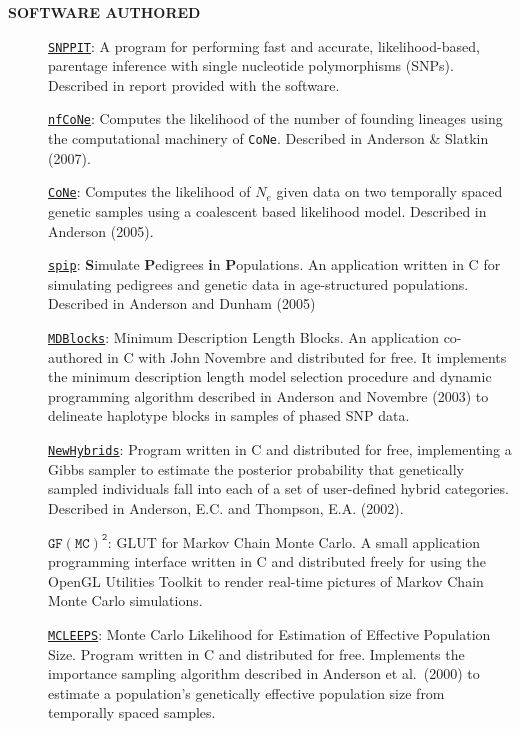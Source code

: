 \documentclass[11pt]{article}
\newlength{\postskip}
\begin{document}
{\bf SOFTWARE AUTHORED}
\begin{description}
\item[]\href{http://swfsc.noaa.gov//staff.aspx?Division=FED&id=740}{\texttt{SNPPIT}}:  
A program for performing fast and accurate, likelihood-based, parentage inference with single nucleotide polymorphisms (SNPs).  Described in report provided with the software.
\item[]\href{http://users.soe.ucsc.edu/~eriq/dokuwiki/doku.php?id=software:nfcone:nfcone_main}{{\tt nfCoNe}}: Computes the likelihood of the number of founding lineages using the computational machinery of {\tt CoNe}.  Described in Anderson \& Slatkin (2007).
\item[]\href{http://swfsc.noaa.gov//staff.aspx?Division=FED&id=740}{\texttt{CoNe}}:  Computes the likelihood of $N_e$ given data on two temporally spaced genetic samples using a coalescent based likelihood model. Described in Anderson (2005).
\item[]\href{http://swfsc.noaa.gov//staff.aspx?Division=FED&id=740}{\texttt{spip}}: {\bf S}imulate {\bf P}edigrees {\bf i}n {\bf P}opulations.  An application written in C for simulating pedigrees and genetic data in age-structured populations.  Described in Anderson and Dunham (2005)
\item[]\href{http://ib.berkeley.edu/labs/slatkin/eriq/software/mdb_web/mdblocks.htm}{\texttt{MDBlocks}}: Minimum Description Length Blocks.  An application co-authored in C with John
Novembre and distributed for free.  It implements the minimum description length model selection
procedure and dynamic programming algorithm described in Anderson and Novembre (2003) to delineate
haplotype blocks in samples of phased SNP data.
\item[]\href{http://ib.berkeley.edu/labs/slatkin/eriq/software/software.htm}{\texttt{NewHybrids}}:  Program written in C and distributed for free, implementing a Gibbs
sampler to estimate the posterior probability that genetically sampled individuals fall into each of a
set of user-defined hybrid categories. Described in Anderson, E.C. and Thompson, E.A.
(2002).
\item[]\href{http://ib.berkeley.edu/labs/slatkin/eriq/software/software.htm}{$\mathtt{GF(MC)^2}$}: GLUT for Markov Chain Monte Carlo. A small application programming
interface written in C and distributed freely for using the OpenGL
Utilities Toolkit to render real-time pictures of Markov Chain Monte Carlo simulations.
\item[]\href{http://www.stat.washington.edu/thompson/Genepi/Mcleeps.shtml}{\texttt{MCLEEPS}}: Monte Carlo Likelihood for Estimation of Effective Population Size. Program
written in C and distributed for free. Implements the importance sampling
algorithm described in Anderson et al.~(2000) to estimate a
population's genetically effective population size from temporally spaced samples. 

\end{description}
\vspace*{\postskip}
\end{document}
